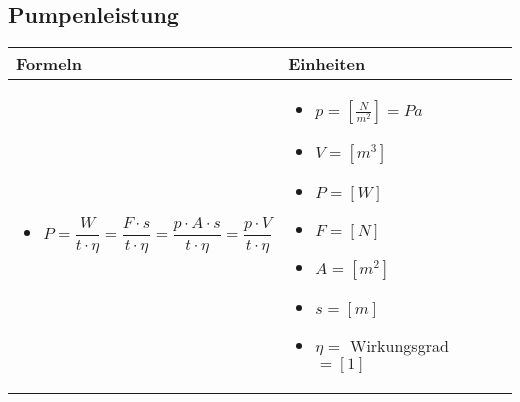 \subsection{Pumpenleistung}				%
	\begin{tabular}{ | m{9cm} | m{9cm}  | }
		\hline
		Formeln & Einheiten \\ \hline
		\hline
		\begin{itemize}
			\item $P=\dfrac{W}{t\cdot \eta}=\dfrac{F\cdot s}{t\cdot \eta}=\dfrac{p\cdot A\cdot s}{t\cdot \eta}=\dfrac{p\cdot V}{t\cdot \eta}$	
		\end{itemize}
		&
		\begin{itemize}
			\item $p= [\frac{N}{m^{2}}]=Pa$
			\item $V=[m^3]$
			\item $P=[W]$
			\item $F=[N]$
			\item $A=[m^{2}]$
			\item $s=[m]$
			\item $\eta=$ Wirkungsgrad $=[1]$
		\end{itemize}
		\\ \hline
	\end{tabular}

\clearpage


